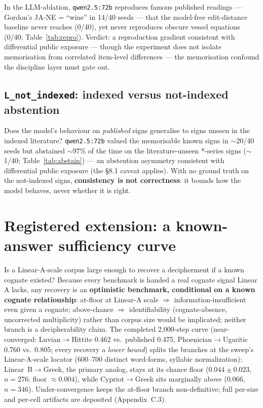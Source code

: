 In the LLM-ablation, \texttt{qwen2.5:72b} reproduces famous
published readings --- Gordon's JA-NE = ``wine'' in 14/40 seeds --- that
the model-free edit-distance baseline never reaches (0/40), yet never
reproduces obscure vessel equations (0/40; Table~\ref{tab:repro}).
Verdict: a reproduction
gradient consistent with differential public exposure --- though the
experiment does not isolate memorisation from correlated item-level
differences --- the memorisation confound the discipline layer must gate
out.

\subsection{\texttt{L\_not\_indexed}: indexed versus not-indexed
abstention}

Does the model's behaviour on \emph{published} signs generalise to signs
unseen in the indexed literature? \texttt{qwen2.5:72b} valued the
memorisable known signs in $\sim$20/40 seeds but abstained $\sim$97\% of
the time on the literature-unseen *-series signs ($\sim$1/40;
Table~\ref{tab:abstain}) --- an
abstention asymmetry consistent with differential public exposure (the
\S8.1 caveat applies). With no ground truth on the not-indexed signs,
\textbf{consistency is not correctness}: it bounds how the model behaves,
never whether it is right.

\section*{Registered extension: a known-answer sufficiency curve}

Is a Linear-A-scale corpus large enough to recover a decipherment if a
known cognate existed? Because every benchmark is handed a real cognate
signal Linear A lacks, any recovery is an \textbf{optimistic benchmark,
conditional on a known cognate relationship}: at-floor at Linear-A scale
$\Rightarrow$ information-insufficient even given a cognate; above-chance
$\Rightarrow$ identifiability (cognate-absence, uncorrected multiplicity)
rather than corpus size would be implicated; neither branch is a
decipherability claim. The completed 2{,}000-step curve (near-converged:
Luvian$\to$Hittite 0.462 vs.\ published 0.475, Phoenician$\to$Ugaritic
0.760 vs.\ 0.805; every recovery a \emph{lower bound}) splits the
branches at the sweep's Linear-A-scale locator (600--700 distinct
word-forms, syllabic normalization): Linear~B$\to$Greek, the primary
analog, stays at its chance floor ($0.044\pm0.023$, $n{=}276$; floor
$\approx0.004$), while Cypriot$\to$Greek sits marginally above
($0.066$, $n{=}346$). Under-convergence keeps the at-floor branch
non-definitive; full per-size and per-cell artifacts are deposited
(Appendix~C.3).

